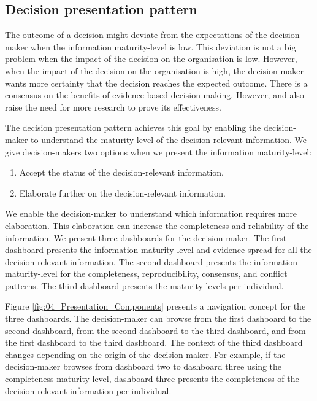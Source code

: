\subsection{Decision presentation pattern} \label{odp_decision_presentation}
The outcome of a decision might deviate from the expectations of the decision-maker when the information maturity-level is low. This deviation is not a big problem when the impact of the decision on the organisation is low. However, when the impact of the decision on the organisation is high, the decision-maker wants more certainty that the decision reaches the expected outcome. There is a consensus on the benefits of evidence-based decision-making. However, \cite{DM03} and \cite{DM07} also raise the need for more research to prove its effectiveness.

\begin{center}
\large\color{document}{The decision presentation pattern helps decision-makers to make evidence-based decisions by presenting the information maturity-level.} 
\end{center}

The decision presentation pattern achieves this goal by enabling the decision-maker to understand the maturity-level of the decision-relevant information. We give decision-makers two options when we present the information maturity-level:
\begin{enumerate}
\item Accept the status of the decision-relevant information.
\item Elaborate further on the decision-relevant information.
\end{enumerate}

We enable the decision-maker to understand which information requires more elaboration. This elaboration can increase the completeness and reliability of the information. We present three dashboards for the decision-maker. The first dashboard presents the information maturity-level and evidence spread for all the decision-relevant information. The second dashboard presents the information maturity-level for the completeness, reproducibility, consensus, and conflict patterns. The third dashboard presents the maturity-levels per individual. 

Figure \ref{fig:04_Presentation_Components} presents a navigation concept for the three dashboards. The decision-maker can browse from the first dashboard to the second dashboard, from the second dashboard to the third dashboard, and from the first dashboard to the third dashboard. The context of the third dashboard changes depending on the origin of the decision-maker. For example, if the decision-maker browses from dashboard two to dashboard three using the completeness maturity-level, dashboard three presents the completeness of the decision-relevant information per individual.

